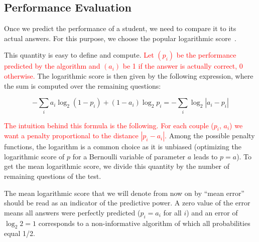 \documentclass{sig-alternate}
\newcommand\alert[1]{\textcolor{red}{#1}}
\begin{document}
\subsection{Performance Evaluation}

Once we predict the performance of a student, we need to compare it to its actual answers. For this purpose, we choose the popular logarithmic score~\cite{Gneiting2007}. 

This quantity is easy to define and compute. \alert{Let $(p_i)$ be the performance predicted by the algorithm and $(a_i)$ be 1 if the answer is actually correct, 0 otherwise.} The logarithmic score is then given by the following expression, where the sum is computed over the remaining questions: 

\[ - \sum_i a_i \log_2 (1 - p_i) + (1-a_i) \log_2 p_i = - \sum_i \log_2 | a_i - p_i | \]

\alert{The intuition behind this formula is the following. For each couple ($p_i$, $a_i$) we want a penalty proportional to the distance $|p_i - a_i|$.} Among the possible penalty functions, the logarithm is a common choice as it is unbiased (optimizing the logarithmic score of $p$ for a Bernoulli variable of parameter $a$ leads to $p=a$). To get the mean logarithmic score, we divide this quantity by the number of remaining questions of the test.

The mean logarithmic score that we will denote from now on by ``mean error'' should be read as an indicator of the predictive power. A zero value of the error means all answers were perfectly predicted ($p_i = a_i$ for all $i$) and an error of $\log_2 2 = 1$ corresponds to a non-informative algorithm of which all probabilities equal 1/2. 

%
\end{document}
